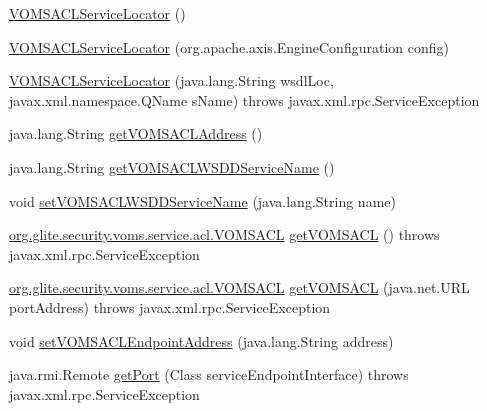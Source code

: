 \begin{DoxyCompactItemize}
\item 
\hyperlink{classorg_1_1glite_1_1security_1_1voms_1_1service_1_1acl_1_1VOMSACLServiceLocator_a754cad168e1e00d7d441021ac3ab9229}{VOMSACLServiceLocator} ()
\item 
\hyperlink{classorg_1_1glite_1_1security_1_1voms_1_1service_1_1acl_1_1VOMSACLServiceLocator_a000d0d50b8382a558242266da0a25d69}{VOMSACLServiceLocator} (org.apache.axis.EngineConfiguration config)
\item 
\hyperlink{classorg_1_1glite_1_1security_1_1voms_1_1service_1_1acl_1_1VOMSACLServiceLocator_a68b443cfe8f854cbe25fd844c6ed89de}{VOMSACLServiceLocator} (java.lang.String wsdlLoc, javax.xml.namespace.QName sName)  throws javax.xml.rpc.ServiceException 
\item 
java.lang.String \hyperlink{classorg_1_1glite_1_1security_1_1voms_1_1service_1_1acl_1_1VOMSACLServiceLocator_a76361c71c6ba78f1eb3b20f0ab6bceca}{getVOMSACLAddress} ()
\item 
java.lang.String \hyperlink{classorg_1_1glite_1_1security_1_1voms_1_1service_1_1acl_1_1VOMSACLServiceLocator_a77eaa50831b3a3f883336824ad4e6061}{getVOMSACLWSDDServiceName} ()
\item 
void \hyperlink{classorg_1_1glite_1_1security_1_1voms_1_1service_1_1acl_1_1VOMSACLServiceLocator_a44dae68868aa1c38b503d231bab15f53}{setVOMSACLWSDDServiceName} (java.lang.String name)
\item 
\hyperlink{interfaceorg_1_1glite_1_1security_1_1voms_1_1service_1_1acl_1_1VOMSACL}{org.glite.security.voms.service.acl.VOMSACL} \hyperlink{classorg_1_1glite_1_1security_1_1voms_1_1service_1_1acl_1_1VOMSACLServiceLocator_a502c55a13b4f26d05a46f9c4c0a20e13}{getVOMSACL} ()  throws javax.xml.rpc.ServiceException 
\item 
\hyperlink{interfaceorg_1_1glite_1_1security_1_1voms_1_1service_1_1acl_1_1VOMSACL}{org.glite.security.voms.service.acl.VOMSACL} \hyperlink{classorg_1_1glite_1_1security_1_1voms_1_1service_1_1acl_1_1VOMSACLServiceLocator_a833a3a621f36b1247c1cfc9448df558c}{getVOMSACL} (java.net.URL portAddress)  throws javax.xml.rpc.ServiceException 
\item 
void \hyperlink{classorg_1_1glite_1_1security_1_1voms_1_1service_1_1acl_1_1VOMSACLServiceLocator_a8e828dfea6377932ac10a244d70ac2a7}{setVOMSACLEndpointAddress} (java.lang.String address)
\item 
java.rmi.Remote \hyperlink{classorg_1_1glite_1_1security_1_1voms_1_1service_1_1acl_1_1VOMSACLServiceLocator_a63512ba56fdaae6f8c91abfe7f3bd9e4}{getPort} (Class serviceEndpointInterface)  throws javax.xml.rpc.ServiceException 

\end{DoxyCompactItemize}
